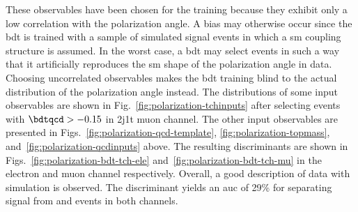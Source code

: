 These observables have been chosen for the training because they exhibit only a low correlation with the polarization angle. A bias may otherwise occur since the \gls{bdt} is trained with a sample of simulated signal events in which a \gls{sm} coupling structure is assumed. In the worst case, a \gls{bdt} may select events in such a way that it artificially reproduces the \gls{sm} shape of the polarization angle in data. Choosing uncorrelated observables makes the \gls{bdt} training blind to the actual distribution of the polarization angle instead. The distributions of some input observables are shown in Fig.~\ref{fig:polarization-tchinputs} after selecting events with $\bdtqcd>-0.15$ in 2j1t muon channel. The other input observables are presented in Figs.~\ref{fig:polarization-qcd-template}, \ref{fig:polarization-topmass}, and~\ref{fig:polarization-qcdinputs} above. The resulting discriminants are shown in Figs.~\ref{fig:polarization-bdt-tch-ele} and~\ref{fig:polarization-bdt-tch-mu} in the electron and muon channel respectively. Overall, a good description of data with simulation is observed. The \bdttch discriminant yields an \gls{auc} of 29\% for separating signal from \wjets and \ttbar events in both channels.




